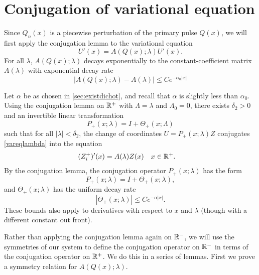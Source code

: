 \documentclass[thesis.tex]{subfiles}
\begin{document}
\section{Conjugation of variational equation}\label{sec:conjvareq}

Since $Q_n(x)$ is a piecewise perturbation of the primary pulse $Q(x)$, we will first apply the conjugation lemma to the variational equation
\begin{equation}\label{vareqlambda}
U'(x) = A(Q(x); \lambda) U'(x).
\end{equation}
For all $\lambda$, $A(Q(x); \lambda)$ decays exponentially to the constant-coefficient matrix $A(\lambda)$ with exponential decay rate
\[
|A(Q(x); \lambda) - A(\lambda)| \leq C e^{-\alpha_0 |x|}
\]

Let $\alpha$ be as chosen in \cref{sec:existdichot}, and recall that $\alpha$ is slightly less than $\alpha_0$. Using the conjugation lemma on $\mathbb{R}^+$ with $\Lambda = \lambda$ and $\Lambda_0 = 0$, there exists $\delta_2 > 0$ and an invertible linear transformation 
\[
P_+(x; \lambda) = I + \Theta_+(x; \Lambda)
\]
such that for all $|\lambda| < \delta_2$, the change of coordinates $U = P_+(x; \lambda) Z$ conjugates \eqref{vareqlambda} into the equation
\begin{align*}\label{Zplus1}
(Z_i^+)'(x) &= A(\lambda) Z(x) && x \in \mathbb{R}^+.
\end{align*}
By the conjugation lemma, the conjugation operator $P_+(x; \lambda)$ has the form
\begin{equation}\label{projTheta}
P_+(x; \lambda) = I + \Theta_+(x; \lambda),
\end{equation}
and $\Theta_+(x; \lambda)$ has the uniform decay rate
\begin{equation}\label{Thetadecay}
|\Theta_+(x; \lambda)| \leq C e^{-\alpha |x|}.
\end{equation}
These bounds also apply to derivatives with respect to $x$ and $\lambda$ (though with a different constant out front).

Rather than applying the conjugation lemma again on $\mathbb{R}^-$, we will use the symmetries of our system to define the conjugation operator on $\mathbb{R}^-$ in terms of the conjugation operator on $\mathbb{R}^+$. We do this in a series of lemmas. First we prove a symmetry relation for $A(Q(x); \lambda)$.
\end{document}
